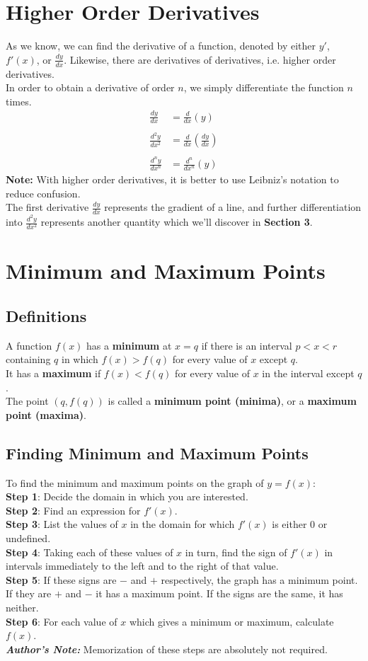 \documentclass[hidelinks, a4paper, 12pt]{article}
\newcommand{\bd}{\textbf}
\newcommand{\n}{\\[\baselineskip]}
\begin{document}
    \section{Higher Order Derivatives}
        As we know, we can find the derivative of a function, denoted by either $y'$, $f'(x)$, or $\frac{dy}{dx}$. Likewise, there are derivatives of derivatives,
        i.e. higher order derivatives.\n
        In order to obtain a derivative of order $n$, we simply differentiate the function $n$ times.
        \[\begin{split}
            \frac{dy}{dx} &= \frac{d}{dx}(y)\\
            \\
            \frac{d^2y}{dx^2} &= \frac{d}{dx}\left(\frac{dy}{dx}\right)\\
            \\
            \frac{d^ny}{dx^n} &= \frac{d^n}{dx^n}(y)
        \end{split}\]
        \bd{Note:} With higher order derivatives, it is better to use Leibniz's notation to reduce confusion.\n
        The first derivative $\frac{dy}{dx}$ represents the gradient of a line, and further differentiation into $\frac{d^2y}{dx^2}$ represents another quantity which we'll discover
        in \bd{Section 3}.

    \section{Minimum and Maximum Points}
        \subsection{Definitions}
            A function $f(x)$ has a \bd{minimum} at $x = q$ if there is an interval $p<x<r$ containing $q$ in which $f(x) > f(q)$ for every value of $x$ except $q$.\n
            It has a \bd{maximum} if $f(x)<f(q)$ for every value of $x$ in the interval except $q$.\n
            The point $(q, f(q))$ is called a \bd{minimum point (minima)}, or a \bd{maximum point (maxima)}.

        \subsection{Finding Minimum and Maximum Points}
            To find the minimum and maximum points on the graph of $y = f(x)$:\n
            \bd{Step 1}: Decide the domain in which you are interested.\n
            \bd{Step 2}: Find an expression for $f'(x)$.\n
            \bd{Step 3}: List the values of $x$ in the domain for which $f'(x)$ is either $0$ or undefined.\n
            \bd{Step 4}: Taking each of these values of $x$ in turn, find the sign of $f'(x)$ in intervals immediately to the left and to the right of that value.\n
            \bd{Step 5}: If these signs are $-$ and $+$ respectively, the graph has a minimum point. If they are $+$ and $-$ it has a maximum point. If the signs are the same, it has neither.\n
            \bd{Step 6}: For each value of $x$ which gives a minimum or maximum, calculate $f(x)$.\n
            \textit{\textbf{Author's Note:}} Memorization of these steps are absolutely not required.
        
\end{document}
